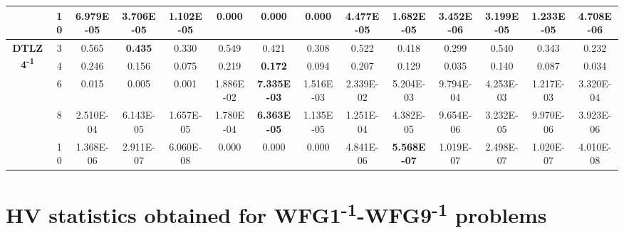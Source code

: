 \documentclass[onecolumn,10pt]{asme2ej}
\begin{document}
\begin{table}[!htb]
\begin{tabular}{|c|c|c|c|c|c|c|c|c|c|c|c|c|c|}
	& 10         & 6.979E-05     & \textbf{3.706E-05} & 1.102E-05      & 0.000         & 0.000              & 0.000          & 4.477E-05     & 1.682E-05          & 3.452E-06      & 3.199E-05     & 1.233E-05          & 4.708E-06      \\ \hline
	\multirow{5}{*}{\textbf{DTLZ4\textsuperscript{-1}}} & 3          & 0.565         & \textbf{0.435}     & 0.330          & 0.549         & 0.421              & 0.308          & 0.522         & 0.418              & 0.299          & 0.540         & 0.343              & 0.232          \\ \cline{2-14} 
	& 4          & 0.246         & 0.156              & 0.075          & 0.219         & \textbf{0.172}     & 0.094          & 0.207         & 0.129              & 0.035          & 0.140         & 0.087              & 0.034          \\ \cline{2-14} 
	& 6          & 0.015         & 0.005              & 0.001          & 1.886E-02     & \textbf{7.335E-03} & 1.516E-03      & 2.339E-02     & 5.204E-03          & 9.794E-04      & 4.253E-03     & 1.217E-03          & 3.320E-04      \\ \cline{2-14} 
	& 8          & 2.510E-04     & 6.143E-05          & 1.657E-05      & 1.780E-04     & \textbf{6.363E-05} & 1.135E-05      & 1.251E-04     & 4.382E-05          & 9.654E-06      & 3.232E-05     & 9.970E-06          & 3.923E-06      \\ \cline{2-14} 
	& 10         & 1.368E-06     & 2.911E-07          & 6.060E-08      & 0.000         & 0.000              & 0.000          & 4.841E-06     & \textbf{5.568E-07} & 1.019E-07      & 2.498E-07     & 1.020E-07          & 4.010E-08      \\ \hline
\end{tabular}
\end{table}

\clearpage
\section{HV statistics obtained for WFG1\textsuperscript{-1}-WFG9\textsuperscript{-1} problems}
\end{document}
